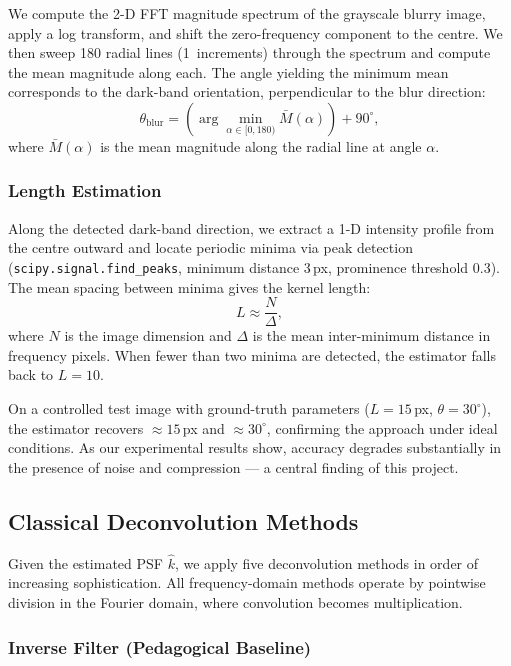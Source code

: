 \documentclass[12pt,a4paper]{article}
\providecommand{\degree}{^{\circ}}
\begin{document}
We compute the 2-D FFT magnitude spectrum of the grayscale blurry image,
apply a log transform, and shift the zero-frequency component to the
centre. We then sweep 180 radial lines (1\textdegree\ increments)
through the spectrum and compute the mean magnitude along each. The
angle yielding the minimum mean corresponds to the dark-band
orientation, perpendicular to the blur direction:
\begin{equation}
  \theta_{\text{blur}} = \left(\arg\min_{\alpha \in [0, 180)} \bar{M}(\alpha)\right) + 90\degree,
\end{equation}
where $\bar{M}(\alpha)$ is the mean magnitude along the radial line at
angle $\alpha$.

\subsubsection{Length Estimation}

Along the detected dark-band direction, we extract a 1-D intensity
profile from the centre outward and locate periodic minima via peak
detection (\texttt{scipy.signal.find\_peaks}, minimum distance 3\,px,
prominence threshold 0.3). The mean spacing between minima gives the
kernel length:
\begin{equation}
  L \approx \frac{N}{\Delta},
\end{equation}
where $N$ is the image dimension and $\Delta$ is the mean inter-minimum
distance in frequency pixels. When fewer than two minima are detected,
the estimator falls back to $L = 10$.

On a controlled test image with ground-truth parameters ($L=15$\,px,
$\theta=30\degree$), the estimator recovers $\approx 15$\,px and
$\approx 30\degree$, confirming the approach under ideal conditions.
As our experimental results show, accuracy degrades substantially in
the presence of noise and compression --- a central finding of this
project.

\subsection{Classical Deconvolution Methods}

Given the estimated PSF $\hat{k}$, we apply five deconvolution methods
in order of increasing sophistication. All frequency-domain methods
operate by pointwise division in the Fourier domain, where convolution
becomes multiplication.

\subsubsection{Inverse Filter (Pedagogical Baseline)}
\end{document}
